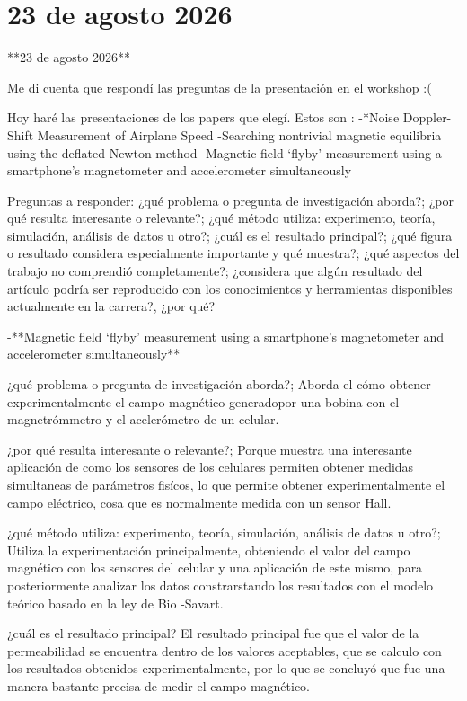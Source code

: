 \documentclass{article}
\begin{document}
\section{23 de agosto 2026}

**23 de agosto 2026**

Me di cuenta que respondí las preguntas de la presentación en el workshop :(

Hoy haré las presentaciones de los papers que elegí. Estos son :
-*Noise Doppler-Shift Measurement of Airplane Speed  
-Searching nontrivial magnetic equilibria using the deflated Newton method  
-Magnetic field ‘flyby’ measurement using a smartphone’s magnetometer and accelerometer simultaneously

Preguntas a responder:
¿qué problema o pregunta de investigación aborda?;
¿por qué resulta interesante o relevante?;
¿qué método utiliza: experimento, teoría, simulación, análisis de datos u otro?;
¿cuál es el resultado principal?;
¿qué figura o resultado considera especialmente importante y qué muestra?;
¿qué aspectos del trabajo no comprendió completamente?;
¿considera que algún resultado del artículo podría ser reproducido con los conocimientos y
herramientas disponibles actualmente en la carrera?, ¿por qué?



-**Magnetic field ‘flyby’ measurement using a smartphone’s magnetometer and accelerometer simultaneously**

¿qué problema o pregunta de investigación aborda?;
Aborda el cómo obtener experimentalmente el campo magnético generadopor una bobina con el magnetrómmetro y el acelerómetro de un celular.

¿por qué resulta interesante o relevante?;
Porque muestra una interesante aplicación de como los sensores de los celulares permiten obtener medidas simultaneas de parámetros fisícos, lo que permite obtener experimentalmente el campo eléctrico, cosa que es normalmente medida con un sensor Hall.

¿qué método utiliza: experimento, teoría, simulación, análisis de datos u otro?;
Utiliza la experimentación principalmente, obteniendo el valor del campo magnético con los sensores del celular y una aplicación de este mismo, para posteriormente analizar los datos constrarstando los resultados con el modelo teórico basado en  la ley de Bio -Savart.

¿cuál es el resultado principal?
El resultado principal fue que el valor de la permeabilidad se encuentra dentro de los valores aceptables,  que se calculo con los resultados obtenidos experimentalmente, por lo que se concluyó que fue una manera bastante precisa de medir el campo magnético.
\end{document}
